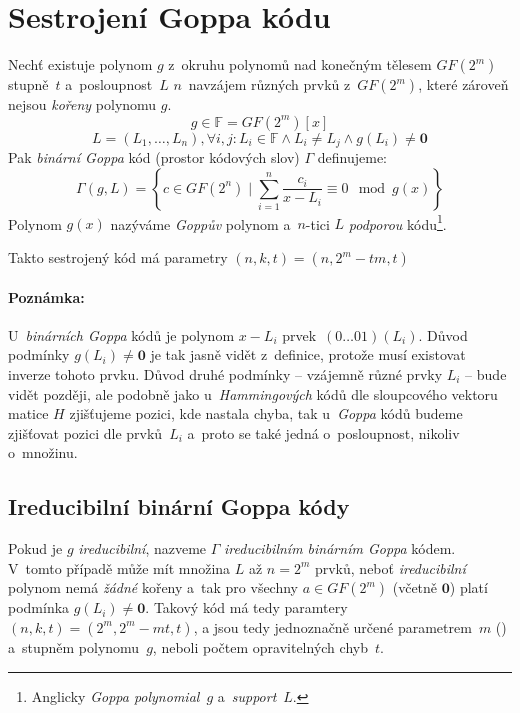 \documentclass[thesis=M,czech,hidelinks]{FITthesis}[2012/06/26]
\newcommand{\0}{{\textcolor[gray]{0.75}{0}}}
\begin{document}
\vfil



\section{Sestrojení Goppa kódu}

Nechť existuje polynom $g$ z~okruhu polynomů nad konečným tělesem $GF(2^m)$
stupně~$t$ a~posloupnost~$L$ $n$~navzájem různých prvků z~$GF(2^m)$, které
zároveň nejsou \emph{kořeny} polynomu $g$.
$$ g \in \mathbb{F} = GF(2^m)[x] $$
$$
    L = \left( L_1, \ldots, L_n \right),
        \forall i,j : L_i \in \mathbb{F} \land L_i \neq L_j \land g(L_i) \neq \mathbf{0}
$$
Pak \emph{binární Goppa} kód (prostor kódových slov) $\Gamma$ definujeme:
$$
    \Gamma(g,L) =
        \left\{
            c \in GF(2^n)
            \;|\;
            \sum_{i=1}^{n} \frac{c_i}{x - L_i} \equiv 0 \mod g(x)
        \right\}
$$
Polynom $g(x)$ nazýváme \emph{Goppův}
polynom a~$n$-tici $L$ \emph{podporou} kódu\footnote{
    Anglicky \emph{Goppa polynomial}~$g$ a~\emph{support}~$L$.
}.

Takto sestrojený kód má parametry $(n,k,t) = (n,2^m-tm,t)$


\paragraph{Poznámka:} U~\emph{binárních Goppa} kódů je polynom $x - L_i$
prvek~$(0\ldots01)(L_i)$. Důvod podmínky $g(L_i) \neq \mathbf{0}$ je tak jasně
vidět z~definice, protože musí existovat inverze tohoto prvku. Důvod druhé
podmínky -- vzájemně různé prvky $L_i$ -- bude vidět později, ale podobně jako
u~\emph{Hammingových} kódů dle sloupcového vektoru matice $H$ zjišťujeme pozici,
kde nastala chyba, tak u~\emph{Goppa} kódů budeme zjišťovat pozici dle
prvků~$L_i$ a~proto se také jedná o~posloupnost, nikoliv o~množinu.


\subsection{Ireducibilní binární Goppa kódy}

Pokud je $g$ \emph{ireducibilní}, nazveme $\Gamma$ \emph{ireducibilním
binárním Goppa} kódem. V~tomto případě může mít množina $L$ až $n=2^m$ prvků,
neboť \emph{ireducibilní} polynom nemá \emph{žádné} kořeny a~tak pro všechny
$a \in GF(2^m)$ (včetně $\mathbf{0}$) platí podmínka $g(L_i) \neq \mathbf{0}$.
Takový kód má tedy paramtery $(n,k,t) = ( 2^m, 2^m - mt, t )$, a jsou tedy
jednoznačně určené parametrem~$m$ () a~stupněm
polynomu~$g$, neboli počtem opravitelných chyb~$t$.
\end{document}
